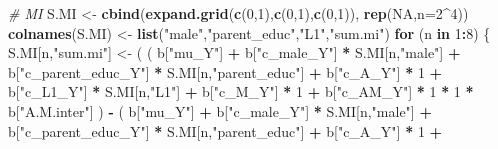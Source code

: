 \documentclass[
]{book}
\newenvironment{Shaded}{\begin{snugshade}}{\end{snugshade}}
\newcommand{\AttributeTok}[1]{\textcolor[rgb]{0.13,0.29,0.53}{#1}}
\newcommand{\CommentTok}[1]{\textcolor[rgb]{0.56,0.35,0.01}{\textit{#1}}}
\newcommand{\ConstantTok}[1]{\textcolor[rgb]{0.56,0.35,0.01}{#1}}
\newcommand{\ControlFlowTok}[1]{\textcolor[rgb]{0.13,0.29,0.53}{\textbf{#1}}}
\newcommand{\DecValTok}[1]{\textcolor[rgb]{0.00,0.00,0.81}{#1}}
\newcommand{\FunctionTok}[1]{\textcolor[rgb]{0.13,0.29,0.53}{\textbf{#1}}}
\newcommand{\NormalTok}[1]{#1}
\newcommand{\OtherTok}[1]{\textcolor[rgb]{0.56,0.35,0.01}{#1}}
\newcommand{\SpecialCharTok}[1]{\textcolor[rgb]{0.81,0.36,0.00}{\textbf{#1}}}
\newcommand{\StringTok}[1]{\textcolor[rgb]{0.31,0.60,0.02}{#1}}
\begin{document}
\begin{Shaded}
\begin{Highlighting}[]
  \CommentTok{\# MI }
\NormalTok{  S.MI }\OtherTok{\textless{}{-}} \FunctionTok{cbind}\NormalTok{(}\FunctionTok{expand.grid}\NormalTok{(}\FunctionTok{c}\NormalTok{(}\DecValTok{0}\NormalTok{,}\DecValTok{1}\NormalTok{),}\FunctionTok{c}\NormalTok{(}\DecValTok{0}\NormalTok{,}\DecValTok{1}\NormalTok{),}\FunctionTok{c}\NormalTok{(}\DecValTok{0}\NormalTok{,}\DecValTok{1}\NormalTok{)), }\FunctionTok{rep}\NormalTok{(}\ConstantTok{NA}\NormalTok{,}\AttributeTok{n=}\DecValTok{2}\SpecialCharTok{\^{}}\DecValTok{4}\NormalTok{))}
  \FunctionTok{colnames}\NormalTok{(S.MI) }\OtherTok{\textless{}{-}} \FunctionTok{list}\NormalTok{(}\StringTok{"male"}\NormalTok{,}\StringTok{"parent\_educ"}\NormalTok{,}\StringTok{"L1"}\NormalTok{,}\StringTok{"sum.mi"}\NormalTok{)}
  \ControlFlowTok{for}\NormalTok{ (n }\ControlFlowTok{in} \DecValTok{1}\SpecialCharTok{:}\DecValTok{8}\NormalTok{) \{}
\NormalTok{    S.MI[n,}\StringTok{"sum.mi"}\NormalTok{] }\OtherTok{\textless{}{-}}\NormalTok{ ( ( b[}\StringTok{"mu\_Y"}\NormalTok{] }\SpecialCharTok{+} 
\NormalTok{                              b[}\StringTok{"c\_male\_Y"}\NormalTok{] }\SpecialCharTok{*}\NormalTok{ S.MI[n,}\StringTok{"male"}\NormalTok{] }\SpecialCharTok{+} 
\NormalTok{                              b[}\StringTok{"c\_parent\_educ\_Y"}\NormalTok{] }\SpecialCharTok{*}\NormalTok{ S.MI[n,}\StringTok{"parent\_educ"}\NormalTok{] }\SpecialCharTok{+} 
\NormalTok{                              b[}\StringTok{"c\_A\_Y"}\NormalTok{] }\SpecialCharTok{*} \DecValTok{1} \SpecialCharTok{+} 
\NormalTok{                              b[}\StringTok{"c\_L1\_Y"}\NormalTok{] }\SpecialCharTok{*}\NormalTok{ S.MI[n,}\StringTok{"L1"}\NormalTok{] }\SpecialCharTok{+}
\NormalTok{                              b[}\StringTok{"c\_M\_Y"}\NormalTok{] }\SpecialCharTok{*} \DecValTok{1} \SpecialCharTok{+}
\NormalTok{                              b[}\StringTok{"c\_AM\_Y"}\NormalTok{] }\SpecialCharTok{*} \DecValTok{1} \SpecialCharTok{*} \DecValTok{1} \SpecialCharTok{*}\NormalTok{ b[}\StringTok{"A.M.inter"}\NormalTok{] ) }\SpecialCharTok{{-}} 
\NormalTok{                            ( b[}\StringTok{"mu\_Y"}\NormalTok{] }\SpecialCharTok{+} 
\NormalTok{                                b[}\StringTok{"c\_male\_Y"}\NormalTok{] }\SpecialCharTok{*}\NormalTok{ S.MI[n,}\StringTok{"male"}\NormalTok{] }\SpecialCharTok{+} 
\NormalTok{                                b[}\StringTok{"c\_parent\_educ\_Y"}\NormalTok{] }\SpecialCharTok{*}\NormalTok{ S.MI[n,}\StringTok{"parent\_educ"}\NormalTok{] }\SpecialCharTok{+} 
\NormalTok{                                b[}\StringTok{"c\_A\_Y"}\NormalTok{] }\SpecialCharTok{*} \DecValTok{1} \SpecialCharTok{+} 

\end{Highlighting}
\end{Shaded}
\end{document}
